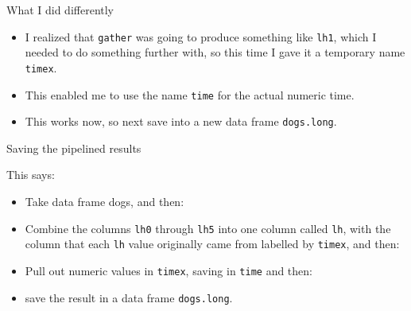 \documentclass[ignorenonframetext,]{beamer}
\newenvironment{Shaded}{\begin{snugshade}}{\end{snugshade}}
\newcommand{\DataTypeTok}[1]{\textcolor[rgb]{0.13,0.29,0.53}{#1}}
\newcommand{\KeywordTok}[1]{\textcolor[rgb]{0.13,0.29,0.53}{\textbf{#1}}}
\newcommand{\NormalTok}[1]{#1}
\newcommand{\OperatorTok}[1]{\textcolor[rgb]{0.81,0.36,0.00}{\textbf{#1}}}
\newcommand{\StringTok}[1]{\textcolor[rgb]{0.31,0.60,0.02}{#1}}
\begin{document}
\begin{frame}[fragile]{What I did differently}
\protect\hypertarget{what-i-did-differently}{}

\begin{itemize}
\item
  I realized that \texttt{gather} was going to produce something like
  \texttt{lh1}, which I needed to do something further with, so this
  time I gave it a temporary name \texttt{timex}.
\item
  This enabled me to use the name \texttt{time} for the actual numeric
  time.
\item
  This works now, so next save into a new data frame \texttt{dogs.long}.
\end{itemize}

\end{frame}

\begin{frame}[fragile]{Saving the pipelined results}
\protect\hypertarget{saving-the-pipelined-results}{}

\begin{Shaded}
\end{Shaded}

This says:

\begin{itemize}
\item
  Take data frame dogs, and then:
\item
  Combine the columns \texttt{lh0} through \texttt{lh5} into one column
  called \texttt{lh}, with the column that each \texttt{lh} value
  originally came from labelled by \texttt{timex}, and then:
\item
  Pull out numeric values in \texttt{timex}, saving in \texttt{time} and
  then:
\item
  save the result in a data frame \texttt{dogs.long}.
\end{itemize}

\end{frame}
\end{document}
